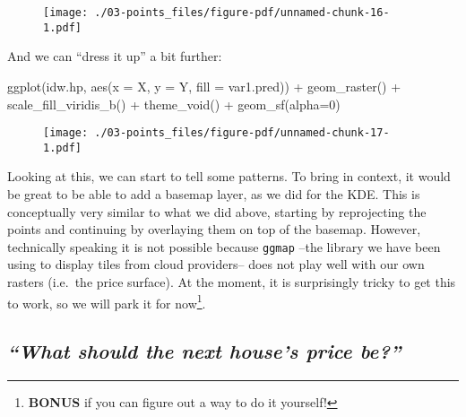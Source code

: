 \documentclass[
  letterpaper,
  krantz2]{style/krantz}
\newenvironment{Shaded}{\begin{snugshade}}{\end{snugshade}}
\newcommand{\AttributeTok}[1]{\textcolor[rgb]{0.40,0.45,0.13}{#1}}
\newcommand{\DecValTok}[1]{\textcolor[rgb]{0.68,0.00,0.00}{#1}}
\newcommand{\FunctionTok}[1]{\textcolor[rgb]{0.28,0.35,0.67}{#1}}
\newcommand{\NormalTok}[1]{\textcolor[rgb]{0.00,0.23,0.31}{#1}}
\newcommand{\SpecialCharTok}[1]{\textcolor[rgb]{0.37,0.37,0.37}{#1}}
\begin{document}
\begin{figure}[H]

{\centering \texttt{[image: ./03-points\_files/figure-pdf/unnamed-chunk-16-1.pdf]}

}

\end{figure}

And we can ``dress it up'' a bit further:

\begin{Shaded}
\begin{Highlighting}[]
\FunctionTok{ggplot}\NormalTok{(idw.hp, }\FunctionTok{aes}\NormalTok{(}\AttributeTok{x =}\NormalTok{ X, }\AttributeTok{y =}\NormalTok{ Y, }\AttributeTok{fill =}\NormalTok{ var1.pred)) }\SpecialCharTok{+}
  \FunctionTok{geom\_raster}\NormalTok{() }\SpecialCharTok{+}
  \FunctionTok{scale\_fill\_viridis\_b}\NormalTok{() }\SpecialCharTok{+}
  \FunctionTok{theme\_void}\NormalTok{() }\SpecialCharTok{+}
  \FunctionTok{geom\_sf}\NormalTok{(}\AttributeTok{alpha=}\DecValTok{0}\NormalTok{)}
\end{Highlighting}
\end{Shaded}

\begin{figure}[H]

{\centering \texttt{[image: ./03-points\_files/figure-pdf/unnamed-chunk-17-1.pdf]}

}

\end{figure}

Looking at this, we can start to tell some patterns. To bring in
context, it would be great to be able to add a basemap layer, as we did
for the KDE. This is conceptually very similar to what we did above,
starting by reprojecting the points and continuing by overlaying them on
top of the basemap. However, technically speaking it is not possible
because \texttt{ggmap} --the library we have been using to display tiles
from cloud providers-- does not play well with our own rasters (i.e.~the
price surface). At the moment, it is surprisingly tricky to get this to
work, so we will park it for now\footnote{\textbf{BONUS} if you can
  figure out a way to do it yourself!}.

\hypertarget{what-should-the-next-houses-price-be}{%
\subsection{\texorpdfstring{\emph{``What should the next house's price
be?''}}{``What should the next house's price be?''}}\label{what-should-the-next-houses-price-be}}
\end{document}
